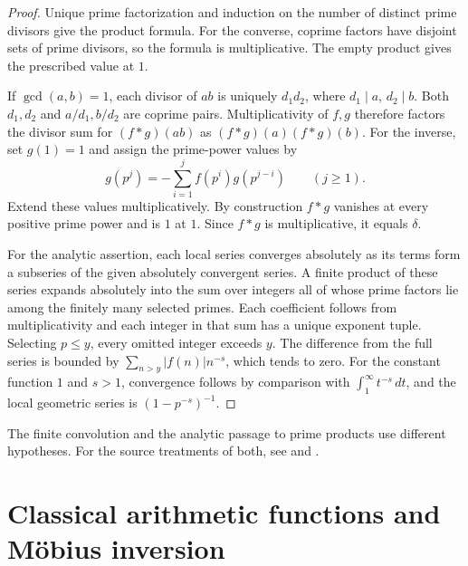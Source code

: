 \documentclass[11pt,oneside,openany]{book}
\theoremstyle{plain}
\theoremstyle{definition}
\theoremstyle{remark}
\begin{document}
\begin{proof}
Unique prime factorization and induction on the number of distinct prime
divisors give the product formula. For the converse, coprime factors
have disjoint sets of prime divisors, so the formula is multiplicative.
The empty product gives the prescribed value at \(1\).

If \(\gcd(a,b)=1\), each divisor of \(ab\) is uniquely \(d_1d_2\), where
\(d_1\mid a\), \(d_2\mid b\). Both \(d_1,d_2\) and \(a/d_1,b/d_2\) are
coprime pairs. Multiplicativity of \(f,g\) therefore factors the divisor
sum for \((f*g)(ab)\) as \((f*g)(a)(f*g)(b)\).
For the inverse, set \(g(1)=1\) and assign the prime-power values by
\[
 g(p^j)=-\sum_{i=1}^j f(p^i)g(p^{j-i})\qquad(j\ge1).
\]
Extend these values multiplicatively. By construction \(f*g\) vanishes
at every positive prime power and is \(1\) at \(1\). Since \(f*g\) is
multiplicative, it equals \(\delta\).

For the analytic assertion, each local series converges absolutely as
its terms form a subseries of the given absolutely convergent series.
A finite product of these series expands absolutely into the sum over
integers all of whose prime factors lie among the finitely many selected
primes. Each coefficient follows from multiplicativity and each integer
in that sum has a unique exponent tuple. Selecting \(p\le y\), every
omitted integer exceeds \(y\). The difference from the full series is
bounded by \(\sum_{n>y}|f(n)|n^{-s}\), which tends to zero. For the
constant function \(1\) and \(s>1\), convergence follows by comparison
with \(\int_1^\infty t^{-s}\,dt\), and the local geometric series is
\((1-p^{-s})^{-1}\).
\end{proof}

The finite convolution and the analytic passage to prime products use
different hypotheses. For the source treatments of both, see
\cite[Sections 2.6--2.11, 2.15, and 11.2--11.5]{apostol} and
\cite[Chapters XVI--XVII]{hardy-wright}.

\section{Classical arithmetic functions and M\"obius inversion}
\end{document}
